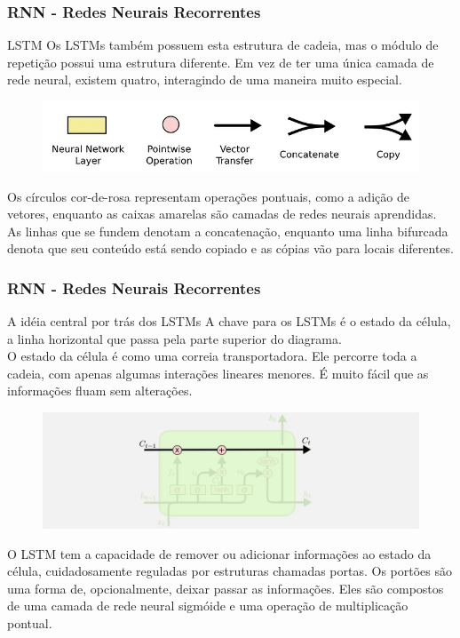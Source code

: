 \documentclass{beamer}
\begin{document}
\begin{frame}
	\frametitle{RNN - Redes Neurais Recorrentes}
	\begin{block}{LSTM}
		Os LSTMs também possuem esta estrutura de cadeia, mas o módulo de repetição possui uma estrutura diferente. Em vez de ter uma única camada de rede neural, existem quatro, interagindo de uma maneira muito especial.
		\begin{figure}
			\centering
			\includegraphics[width=0.7\linewidth]{figures/lstm2}
		\end{figure}
		Os círculos cor-de-rosa representam operações pontuais, como a adição de vetores, enquanto as caixas amarelas são camadas de redes neurais aprendidas. As linhas que se fundem denotam a concatenação, enquanto uma linha bifurcada denota que seu conteúdo está sendo copiado e as cópias vão para locais diferentes.
	\end{block}
\end{frame}
\begin{frame}
	\frametitle{RNN - Redes Neurais Recorrentes}
	\begin{block}{A idéia central por trás dos LSTMs}
		A chave para os LSTMs é o estado da célula, a linha horizontal que passa pela parte superior do diagrama. \\
		O estado da célula é como uma correia transportadora. Ele percorre toda a cadeia, com apenas algumas interações lineares menores. É muito fácil que as informações fluam sem alterações.
		\begin{figure}
			\centering
			\includegraphics[width=0.5\linewidth]{figures/lstm3}
		\end{figure}
		O LSTM tem a capacidade de remover ou adicionar informações ao estado da célula, cuidadosamente reguladas por estruturas chamadas portas.		
		Os portões são uma forma de, opcionalmente, deixar passar as informações. Eles são compostos de uma camada de rede neural sigmóide e uma operação de multiplicação pontual.
	\end{block}
\end{frame}
\end{document}
